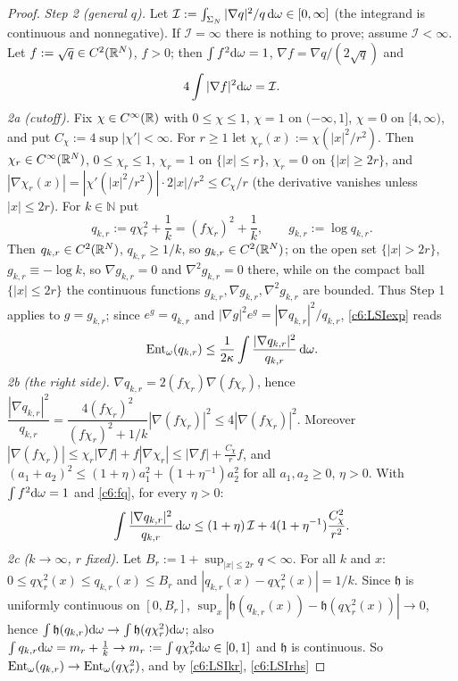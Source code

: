 \begin{proof}
\emph{Step 2 (general $q$).} Let $\mathcal I:=\int_{\Sigma_N}|\nabla q|^2/q\,\mathrm{d}\omega\in[0,\infty]$ (the integrand is continuous and nonnegative). If $\mathcal I=\infty$ there is nothing to prove; assume $\mathcal I<\infty$.
Let $f:=\sqrt q\in C^2(\mathbb{R}^N)$, $f>0$; then $\int f^2\mathrm{d}\omega=1$, $\nabla f=\nabla q/(2\sqrt q)$ and
\begin{equation}\label{c6:fq}
4\int|\nabla f|^2\mathrm{d}\omega=\mathcal I .
\end{equation}
\emph{2a (cutoff).} Fix $\chi\in C^\infty(\mathbb{R})$ with $0\le\chi\le1$, $\chi=1$ on $(-\infty,1]$, $\chi=0$ on $[4,\infty)$, and put $C_\chi:=4\sup|\chi'|<\infty$.
For $r\ge1$ let $\chi_r(x):=\chi(|x|^2/r^2)$. Then $\chi_r\in C^\infty(\mathbb{R}^N)$, $0\le\chi_r\le1$, $\chi_r=1$ on $\{|x|\le r\}$, $\chi_r=0$ on $\{|x|\ge2r\}$, and
$|\nabla\chi_r(x)|=|\chi'(|x|^2/r^2)|\cdot2|x|/r^2\le C_\chi/r$ (the derivative vanishes unless $|x|\le2r$).
For $k\in\mathbb N$ put
\[q_{k,r}:=q\chi_r^2+\frac1k=(f\chi_r)^2+\frac1k,\qquad g_{k,r}:=\log q_{k,r}.\]
Then $q_{k,r}\in C^2(\mathbb{R}^N)$, $q_{k,r}\ge1/k$, so $g_{k,r}\in C^2(\mathbb{R}^N)$; on the open set $\{|x|>2r\}$, $g_{k,r}\equiv-\log k$, so $\nabla g_{k,r}=0$ and $\nabla^2g_{k,r}=0$ there, while on the compact ball $\{|x|\le2r\}$ the continuous functions $g_{k,r},\nabla g_{k,r},\nabla^2g_{k,r}$ are bounded. Thus Step 1 applies to $g=g_{k,r}$; since $e^{g}=q_{k,r}$ and $|\nabla g|^2e^g=|\nabla q_{k,r}|^2/q_{k,r}$, \eqref{c6:LSIexp} reads
\begin{equation}\label{c6:LSIkr}
\operatorname{Ent}_\omega(q_{k,r})\le\frac1{2\kappa}\int\frac{|\nabla q_{k,r}|^2}{q_{k,r}}\,\mathrm{d}\omega .
\end{equation}
\emph{2b (the right side).} $\nabla q_{k,r}=2(f\chi_r)\nabla(f\chi_r)$, hence
$\dfrac{|\nabla q_{k,r}|^2}{q_{k,r}}=\dfrac{4(f\chi_r)^2}{(f\chi_r)^2+1/k}|\nabla(f\chi_r)|^2\le4|\nabla(f\chi_r)|^2$.
Moreover $|\nabla(f\chi_r)|\le\chi_r|\nabla f|+f|\nabla\chi_r|\le|\nabla f|+\frac{C_\chi}rf$, and $(a_1+a_2)^2\le(1+\eta)a_1^2+(1+\eta^{-1})a_2^2$ for all $a_1,a_2\ge0$, $\eta>0$. With $\int f^2\mathrm{d}\omega=1$ and \eqref{c6:fq}, for every $\eta>0$:
\begin{equation}\label{c6:LSIrhs}
\int\frac{|\nabla q_{k,r}|^2}{q_{k,r}}\,\mathrm{d}\omega\le(1+\eta)\,\mathcal I+4(1+\eta^{-1})\frac{C_\chi^2}{r^2}.
\end{equation}
\emph{2c ($k\to\infty$, $r$ fixed).} Let $B_r:=1+\sup_{|x|\le2r}q<\infty$. For all $k$ and $x$: $0\le q\chi_r^2(x)\le q_{k,r}(x)\le B_r$ and $|q_{k,r}(x)-q\chi_r^2(x)|=1/k$. Since $\mathfrak h$ is uniformly continuous on $[0,B_r]$, $\sup_x|\mathfrak h(q_{k,r}(x))-\mathfrak h(q\chi_r^2(x))|\to0$, hence $\int\mathfrak h(q_{k,r})\mathrm{d}\omega\to\int\mathfrak h(q\chi_r^2)\mathrm{d}\omega$; also $\int q_{k,r}\mathrm{d}\omega=m_r+\frac1k\to m_r:=\int q\chi_r^2\mathrm{d}\omega\in[0,1]$ and $\mathfrak h$ is continuous. So $\operatorname{Ent}_\omega(q_{k,r})\to\operatorname{Ent}_\omega(q\chi_r^2)$, and by \eqref{c6:LSIkr}, \eqref{c6:LSIrhs}

\end{proof}
